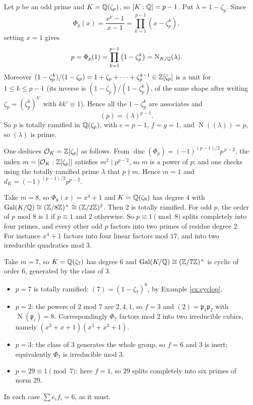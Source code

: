 \documentclass[a4paper]{scrartcl}
\renewcommand{\OO}{\mathcal{O}}
\newcommand{\disc}{\operatorname{disc}}
\newcommand{\Nm}{\operatorname{N}}
\newcommand{\Gal}{\operatorname{Gal}}
\newcommand{\fp}{\mathfrak{p}}
\begin{document}
\begin{example}\label{ex:cyclop}
	Let $p$ be an odd prime and $K = \mathbb{Q}(\zeta_p)$, so $[K:\mathbb{Q}] = p-1$. Put $\lambda = 1-\zeta_p$. Since
	$$\Phi_p(x) = \frac{x^p-1}{x-1} = \prod_{k=1}^{p-1}\left(x - \zeta_p^k\right),$$
	setting $x = 1$ gives
	$$p = \Phi_p(1) = \prod_{k=1}^{p-1}\left(1-\zeta_p^k\right) = \Nm_{K/\Q}(\lambda).$$
	Moreover $(1-\zeta_p^k)/(1-\zeta_p) = 1 + \zeta_p + \dots+\zeta_p^{k-1} \in \mathbb{Z}[\zeta_p]$ is a unit for $1 \leq k \leq p-1$ (its inverse is $(1-\zeta_p)/(1-\zeta_p^k)$, of the same shape after writing $\zeta_p = (\zeta_p^k)^{k'}$ with $kk'\equiv 1$). Hence all the $1 - \zeta_p^k$ are associates and
	$$(p) = (\lambda)^{p-1}.$$
	So $p$ is totally ramified in $\mathbb{Q}(\zeta_p)$, with $e = p-1$, $f = g = 1$, and $\Nm((\lambda)) = p$, so $(\lambda)$ is prime.

	One deduces $\OO_K = \Z[\zeta_p]$ as follows. From $\disc(\Phi_p) = (-1)^{(p-1)/2}p^{\,p-2}$, the index $m = [\OO_K:\Z[\zeta_p]]$ satisfies $m^2 \mid p^{p-2}$, so $m$ is a power of $p$; and one checks using the totally ramified prime $\lambda$ that $p \nmid m$. Hence $m=1$ and $d_K = (-1)^{(p-1)/2}p^{p-2}$.
\end{example}

\begin{example}
	Take $m = 8$, so $\Phi_8(x) = x^4+1$ and $K = \mathbb{Q}(\zeta_8)$ has degree $4$ with $\Gal(K/\Q) \cong (\Z/8\Z)^\times \cong (\Z/2\Z)^2$. Then $2$ is totally ramified. For odd $p$, the order of $p$ mod $8$ is $1$ if $p \equiv 1$ and $2$ otherwise. So $p \equiv 1\pmod 8$ splits completely into four primes, and every other odd $p$ factors into two primes of residue degree $2$. For instance $x^4+1$ factors into four linear factors mod $17$, and into two irreducible quadratics mod $3$.
\end{example}

\begin{example}
	Take $m = 7$, so $K = \mathbb{Q}(\zeta_7)$ has degree $6$ and $\Gal(K/\Q)\cong(\Z/7\Z)^\times$ is cyclic of order $6$, generated by the class of $3$.
	\begin{itemize}
		\item $p = 7$ is totally ramified: $(7) = (1-\zeta_7)^6$, by Example \ref{ex:cyclop}.
		\item $p=2$: the powers of $2$ mod $7$ are $2,4,1$, so $f = 3$ and $(2) = \fp_1\fp_2$ with $\Nm(\fp_i) = 8$. Correspondingly $\Phi_7$ factors mod $2$ into two irreducible cubics, namely $(x^3+x+1)(x^3+x^2+1)$.
		\item $p=3$: the class of $3$ generates the whole group, so $f = 6$ and $3$ is inert; equivalently $\Phi_7$ is irreducible mod $3$.
		\item $p = 29 \equiv 1 \pmod 7$: here $f=1$, so $29$ splits completely into six primes of norm $29$.
	\end{itemize}
	In each case $\sum e_if_i = 6$, as it must.
\end{example}
\end{document}
